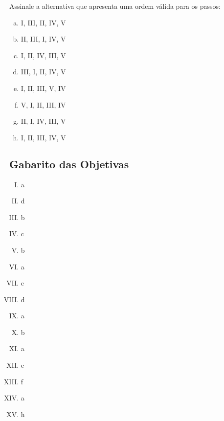 \documentclass{dlproblemset}
\begin{document}
\begin{enumerate}[I)]
Assinale a alternativa que apresenta uma ordem válida para os passos:
\begin{enumerate}[(a)]
    \item I, III, II, IV, V
    \item II, III, I, IV, V
    \item I, II, IV, III, V
    \item III, I, II, IV, V
    \item I, II, III, V, IV
    \item V, I, II, III, IV
    \item II, I, IV, III, V
    \item I, II, III, IV, V
\end{enumerate}

\end{enumerate}

\subsection*{Gabarito das Objetivas}
\begin{enumerate}[I)]
    \item a
    \item d
    \item b
    \item c
    \item b
    \item a
    \item c
    \item d
    \item a
    \item b
    \item a
    \item c
    \item f
    \item a
    \item h
\end{enumerate}
\end{document}
